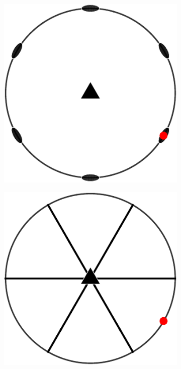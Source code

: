\documentclass[compress]{beamer}
\begin{document}
\begin{frame}

  \begin{figure}[H]
    \centering
    \begin{subfigure}{0.3\textwidth}
      \includegraphics[width=\textwidth]{pic/sym321}
    \end{subfigure}
    \begin{subfigure}{0.3\textwidth}
      \includegraphics[width=\textwidth]{pic/sym3m1}

\end{subfigure}
\end{figure}
\end{frame}
\end{document}
